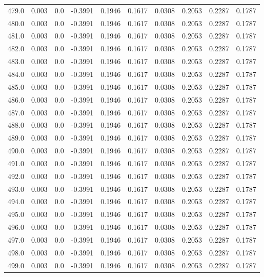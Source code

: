 \begin{longtable}{lrrrrrrrrr}
479.0 & 0.003 & 0.0 & -0.3991 & 0.1946 & 0.1617 & 0.0308 & 0.2053 & 0.2287 & 0.1787 \\
480.0 & 0.003 & 0.0 & -0.3991 & 0.1946 & 0.1617 & 0.0308 & 0.2053 & 0.2287 & 0.1787 \\
481.0 & 0.003 & 0.0 & -0.3991 & 0.1946 & 0.1617 & 0.0308 & 0.2053 & 0.2287 & 0.1787 \\
482.0 & 0.003 & 0.0 & -0.3991 & 0.1946 & 0.1617 & 0.0308 & 0.2053 & 0.2287 & 0.1787 \\
483.0 & 0.003 & 0.0 & -0.3991 & 0.1946 & 0.1617 & 0.0308 & 0.2053 & 0.2287 & 0.1787 \\
484.0 & 0.003 & 0.0 & -0.3991 & 0.1946 & 0.1617 & 0.0308 & 0.2053 & 0.2287 & 0.1787 \\
485.0 & 0.003 & 0.0 & -0.3991 & 0.1946 & 0.1617 & 0.0308 & 0.2053 & 0.2287 & 0.1787 \\
486.0 & 0.003 & 0.0 & -0.3991 & 0.1946 & 0.1617 & 0.0308 & 0.2053 & 0.2287 & 0.1787 \\
487.0 & 0.003 & 0.0 & -0.3991 & 0.1946 & 0.1617 & 0.0308 & 0.2053 & 0.2287 & 0.1787 \\
488.0 & 0.003 & 0.0 & -0.3991 & 0.1946 & 0.1617 & 0.0308 & 0.2053 & 0.2287 & 0.1787 \\
489.0 & 0.003 & 0.0 & -0.3991 & 0.1946 & 0.1617 & 0.0308 & 0.2053 & 0.2287 & 0.1787 \\
490.0 & 0.003 & 0.0 & -0.3991 & 0.1946 & 0.1617 & 0.0308 & 0.2053 & 0.2287 & 0.1787 \\
491.0 & 0.003 & 0.0 & -0.3991 & 0.1946 & 0.1617 & 0.0308 & 0.2053 & 0.2287 & 0.1787 \\
492.0 & 0.003 & 0.0 & -0.3991 & 0.1946 & 0.1617 & 0.0308 & 0.2053 & 0.2287 & 0.1787 \\
493.0 & 0.003 & 0.0 & -0.3991 & 0.1946 & 0.1617 & 0.0308 & 0.2053 & 0.2287 & 0.1787 \\
494.0 & 0.003 & 0.0 & -0.3991 & 0.1946 & 0.1617 & 0.0308 & 0.2053 & 0.2287 & 0.1787 \\
495.0 & 0.003 & 0.0 & -0.3991 & 0.1946 & 0.1617 & 0.0308 & 0.2053 & 0.2287 & 0.1787 \\
496.0 & 0.003 & 0.0 & -0.3991 & 0.1946 & 0.1617 & 0.0308 & 0.2053 & 0.2287 & 0.1787 \\
497.0 & 0.003 & 0.0 & -0.3991 & 0.1946 & 0.1617 & 0.0308 & 0.2053 & 0.2287 & 0.1787 \\
498.0 & 0.003 & 0.0 & -0.3991 & 0.1946 & 0.1617 & 0.0308 & 0.2053 & 0.2287 & 0.1787 \\
499.0 & 0.003 & 0.0 & -0.3991 & 0.1946 & 0.1617 & 0.0308 & 0.2053 & 0.2287 & 0.1787 \\

\end{longtable}
